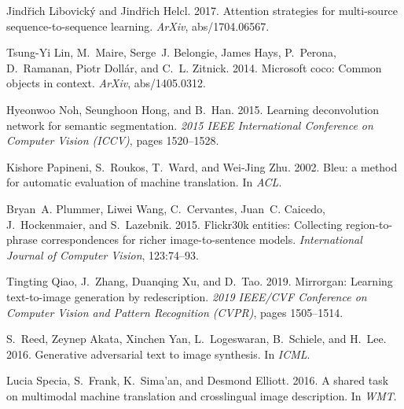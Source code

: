 \documentclass[11pt]{article}
\begin{document}
\begin{thebibliography}{36}
Jindřich Libovick{\'y} and Jindřich Helcl. 2017.
\newblock Attention strategies for multi-source sequence-to-sequence learning.
\newblock \emph{ArXiv}, abs/1704.06567.

Tsung-Yi Lin, M.~Maire, Serge~J. Belongie, James Hays, P.~Perona, D.~Ramanan,
  Piotr Doll{\'a}r, and C.~L. Zitnick. 2014.
\newblock Microsoft coco: Common objects in context.
\newblock \emph{ArXiv}, abs/1405.0312.

Hyeonwoo Noh, Seunghoon Hong, and B.~Han. 2015.
\newblock Learning deconvolution network for semantic segmentation.
\newblock \emph{2015 IEEE International Conference on Computer Vision (ICCV)},
  pages 1520--1528.

Kishore Papineni, S.~Roukos, T.~Ward, and Wei-Jing Zhu. 2002.
\newblock Bleu: a method for automatic evaluation of machine translation.
\newblock In \emph{ACL}.

Bryan~A. Plummer, Liwei Wang, C.~Cervantes, Juan~C. Caicedo, J.~Hockenmaier,
  and S.~Lazebnik. 2015.
\newblock Flickr30k entities: Collecting region-to-phrase correspondences for
  richer image-to-sentence models.
\newblock \emph{International Journal of Computer Vision}, 123:74--93.

Tingting Qiao, J.~Zhang, Duanqing Xu, and D.~Tao. 2019.
\newblock Mirrorgan: Learning text-to-image generation by redescription.
\newblock \emph{2019 IEEE/CVF Conference on Computer Vision and Pattern
  Recognition (CVPR)}, pages 1505--1514.

S.~Reed, Zeynep Akata, Xinchen Yan, L.~Logeswaran, B.~Schiele, and H.~Lee.
  2016.
\newblock Generative adversarial text to image synthesis.
\newblock In \emph{ICML}.

Lucia Specia, S.~Frank, K.~Sima'an, and Desmond Elliott. 2016.
\newblock A shared task on multimodal machine translation and crosslingual
  image description.
\newblock In \emph{WMT}.


\end{thebibliography}
\end{document}
